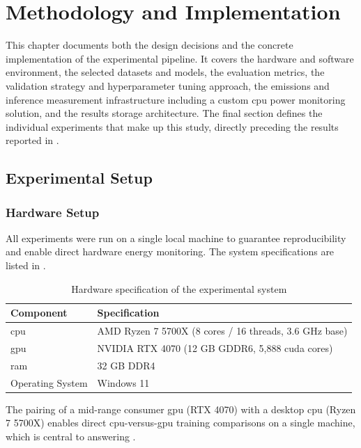 \chapter{Methodology and Implementation}
\label{experimental_design}
\label{implementation}

This chapter documents both the design decisions and the concrete implementation of the experimental pipeline. It covers the hardware and software environment, the selected datasets and models, the evaluation metrics, the validation strategy and hyperparameter tuning approach, the emissions and inference measurement infrastructure including a custom \gls{cpu} power monitoring solution, and the results storage architecture. The final section defines the individual experiments that make up this study, directly preceding the results reported in .

\section{Experimental Setup}

\subsection{Hardware Setup}
\label{sec:implementation_hardware}

All experiments were run on a single local machine to guarantee reproducibility and enable direct hardware energy monitoring. The system specifications are listed in .

\begin{table}[htbp]
\centering
\caption{Hardware specification of the experimental system}
\label{tab:hardware}
\begin{tabular}{ll}
\toprule
\textbf{Component} & \textbf{Specification} \\
\midrule
\gls{cpu} & AMD Ryzen 7 5700X (8 cores / 16 threads, 3.6 GHz base) \\
\gls{gpu} & NVIDIA RTX 4070 (12 GB GDDR6, 5{,}888 \gls{cuda} cores) \\
\gls{ram} & 32 GB DDR4 \\
Operating System & Windows 11 \\
\bottomrule
\end{tabular}
\end{table}

The pairing of a mid-range consumer \gls{gpu} (RTX 4070) with a desktop \gls{cpu} (Ryzen 7 5700X) enables direct \gls{cpu}-versus-\gls{gpu} training comparisons on a single machine, which is central to answering .

